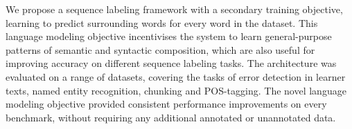 We propose a sequence labeling framework with a secondary training objective, learning to predict surrounding words for every word in the dataset. This language modeling objective incentivises the system to learn general-purpose patterns of semantic and syntactic composition, which are also useful for improving accuracy on different sequence labeling tasks. The architecture was evaluated on a range of datasets, covering the tasks of error detection in learner texts, named entity recognition, chunking and POS-tagging. The novel language modeling objective provided consistent performance improvements on every benchmark, without requiring any additional annotated or unannotated data.
